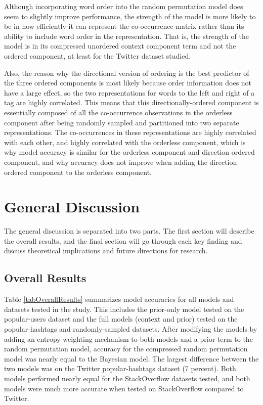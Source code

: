 \documentclass[man,floatsintext,donotrepeattitle]{apa6}
\begin{document}
Although incorporating word order into the random permutation model does seem to slightly improve performance,
the strength of the model is more likely to be in how efficiently it can represent the co-occurrence matrix rather than its ability to include word order in the representation.
That is, the strength of the model is in its compressed unordered context component term and not the ordered component, at least for the Twitter dataset studied.

Also, the reason why the directional version of ordering is the best predictor of the three ordered components is most likely because order information does not have a large effect,
so the two representations for words to the left and right of a tag are highly correlated.
This means that this directionally-ordered component is essentially composed of all the co-occurrence observations in the orderless component after being randomly sampled and partitioned into two separate representations.
The co-occurrences in these representations are highly correlated with each other, and highly correlated with the orderless component,
which is why model accuracy is similar for the orderless component and direction ordered component, and why accuracy does not improve when adding the direction ordered component to the orderless component.

\section{General Discussion}

The general discussion is separated into two parts.
The first section will describe the overall results,
and the final section will go through each key finding and discuss theoretical implications and future directions for research.

\subsection{Overall Results}

Table \ref{tabOverallResults} summarizes model accuracies for all models and datasets tested in the study.
This includes the prior-only model tested on the popular-users dataset and the full models (context and prior) tested on the popular-hashtags and randomly-sampled datasets.
After modifying the models by adding an entropy weighting mechanism to both models and a prior term to the random permutation model,
accuracy for the compressed random permutation model was nearly equal to the Bayesian model.
The largest difference between the two models was on the Twitter popular-hashtags dataset (7 percent).
Both models performed nearly equal for the StackOverflow datasets tested,
and both models were much more accurate when tested on StackOverflow compared to Twitter.
\end{document}
